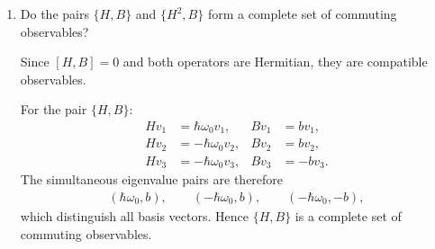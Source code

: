 \documentclass[11pt,a4paper]{scrartcl}
\begin{document}
\begin{enumerate}[label=(\alph*)]
\begin{calculationbox}
        For $B$, we have
        \begin{align*}
            B\phi_1 = b\phi_1,
        \end{align*}
        and on the subspace spanned by $\phi_2,\phi_3$,
        \begin{align*}
            B_0 =
            \begin{pmatrix}
                0 & 1 \\
                1 & 0
            \end{pmatrix}.
        \end{align*}
        Its eigenvalues are $\lambda = \pm 1$, with normalized eigenvectors
        \begin{align*}
            v_2 = \frac{1}{\sqrt{2}}(\phi_2 + \phi_3),
            \qquad
            v_3 = \frac{1}{\sqrt{2}}(\phi_2 - \phi_3).
        \end{align*}
        Also
        \begin{align*}
            v_1 = \phi_1.
        \end{align*}

        Therefore a common eigenbasis of $H$ and $B$ is
        \begin{align*}
            v_1 &= \phi_1,
            \\
            v_2 &= \frac{1}{\sqrt{2}}(\phi_2 + \phi_3),
            \\
            v_3 &= \frac{1}{\sqrt{2}}(\phi_2 - \phi_3).
        \end{align*}
    \end{calculationbox}

    \item Do the pairs $\{H,B\}$ and $\{H^2,B\}$ form a complete set of commuting observables?
    \begin{calculationbox}
        Since $[H,B]=0$ and both operators are Hermitian, they are compatible observables.

        For the pair $\{H,B\}$:
        \begin{align*}
            H v_1 &= \hbar\omega_0 v_1, & B v_1 &= b v_1,
            \\
            H v_2 &= -\hbar\omega_0 v_2, & B v_2 &= b v_2,
            \\
            H v_3 &= -\hbar\omega_0 v_3, & B v_3 &= -b v_3.
        \end{align*}
        The simultaneous eigenvalue pairs are therefore
        \begin{align*}
            (\hbar\omega_0,b), \qquad (-\hbar\omega_0,b), \qquad (-\hbar\omega_0,-b),
        \end{align*}
        which distinguish all basis vectors. Hence $\{H,B\}$ is a complete set of commuting observables.


\end{calculationbox}
\end{enumerate}
\end{document}
